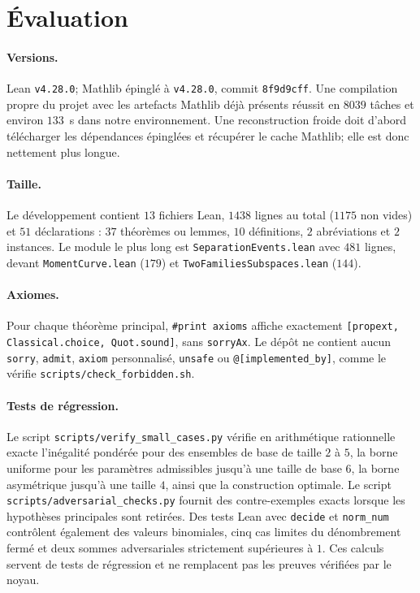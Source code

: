 \documentclass[11pt]{article}
\begin{document}
\section{Évaluation}\label{sec:eval}

\paragraph{Versions.} Lean \texttt{v4.28.0}; Mathlib épinglé à
\texttt{v4.28.0}, commit \texttt{8f9d9cff}. Une compilation propre du projet avec les
artefacts Mathlib déjà présents réussit en $8039$ tâches et environ $133$~s dans notre
environnement. Une reconstruction froide doit d'abord télécharger les dépendances
épinglées et récupérer le cache Mathlib; elle est donc nettement plus longue.

\paragraph{Taille.} Le développement contient $13$ fichiers Lean, $1438$ lignes au
total ($1175$ non vides) et $51$ déclarations : $37$ théorèmes ou lemmes, $10$
définitions, $2$ abréviations et $2$ instances. Le module le plus long est
\texttt{SeparationEvents.lean} avec $481$ lignes, devant
\texttt{MomentCurve.lean} ($179$) et \texttt{TwoFamiliesSubspaces.lean} ($144$).

\paragraph{Axiomes.} Pour chaque théorème principal, \lstinline{#print axioms} affiche
exactement \lstinline{[propext, Classical.choice, Quot.sound]}, sans
\lstinline{sorryAx}. Le dépôt ne contient aucun \lstinline{sorry}, \lstinline{admit},
\lstinline{axiom} personnalisé, \lstinline{unsafe} ou
\lstinline{@[implemented_by]}, comme le vérifie
\texttt{scripts/check\_forbidden.sh}.

\paragraph{Tests de régression.} Le script
\texttt{scripts/verify\_small\_cases.py} vérifie en arithmétique rationnelle exacte
l'inégalité pondérée pour des ensembles de base de taille $2$ à $5$, la borne uniforme
pour les paramètres admissibles jusqu'à une taille de base $6$, la borne asymétrique
jusqu'à une taille $4$, ainsi que la construction optimale. Le script
\texttt{scripts/adversarial\_checks.py} fournit des contre-exemples exacts lorsque les
hypothèses principales sont retirées. Des tests Lean avec \lstinline{decide} et
\lstinline{norm_num} contrôlent également des valeurs binomiales, cinq cas limites du
dénombrement fermé et deux sommes adversariales strictement supérieures à $1$. Ces
calculs servent de tests de régression et ne remplacent pas les preuves vérifiées par le
noyau.
\end{document}
